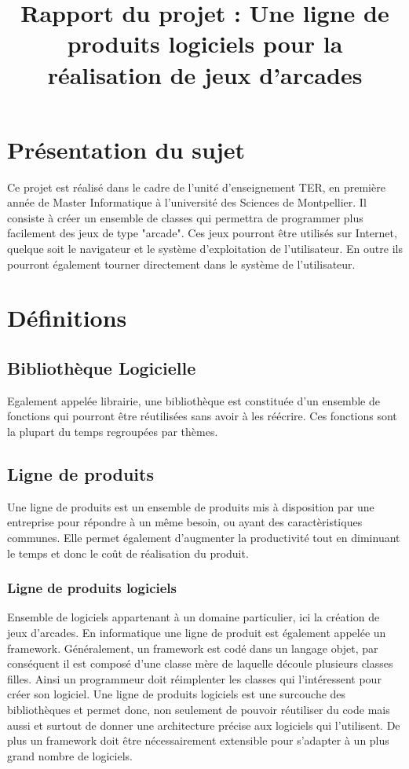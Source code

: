 \documentclass{article}
\title{Rapport du projet : Une ligne de produits logiciels pour la réalisation de jeux d'arcades}
\begin{document}
\maketitle{}

\tableofcontents

\newpage

\section{Présentation du sujet}

	Ce projet est réalisé dans le cadre de l'unité d'enseignement TER, en première année de Master Informatique à l'université des Sciences de Montpellier.
	\indent Il consiste à créer un ensemble de classes qui permettra de programmer plus facilement des jeux de type "arcade". Ces jeux pourront être utilisés sur Internet, quelque soit le navigateur et le système d'exploitation de l'utilisateur. En outre ils pourront également tourner directement dans le système de l'utilisateur.

\section{Définitions}

	\subsection{Bibliothèque Logicielle}
		Egalement appelée librairie, une bibliothèque est constituée d'un ensemble de fonctions qui pourront être réutilisées sans avoir à les réécrire. Ces fonctions sont la plupart du temps regroupées par thèmes.

	\subsection{Ligne de produits}
		Une ligne de produits est un ensemble de produits mis à disposition par une entreprise pour répondre à un même besoin, ou ayant des caractèristiques communes. Elle permet également d'augmenter la productivité tout en diminuant le temps et donc le coût de réalisation du produit.
		\subsubsection*{Ligne de produits logiciels}
			Ensemble de logiciels appartenant à un domaine particulier, ici la création de jeux d'arcades. En informatique une ligne de produit est également appelée un framework. Généralement, un framework est codé dans un langage objet, par conséquent il est composé d'une classe mère de laquelle découle plusieurs classes filles. Ainsi un programmeur doit réimplenter les classes qui l'intéressent pour créer son logiciel. 
			\indent Une ligne de produits logiciels est une surcouche des bibliothèques et permet donc, non seulement de pouvoir réutiliser du code mais aussi et surtout de donner une architecture précise aux logiciels qui l'utilisent. De plus un framework doit être nécessairement extensible pour s'adapter à un plus grand nombre de logiciels.
\end{document}
